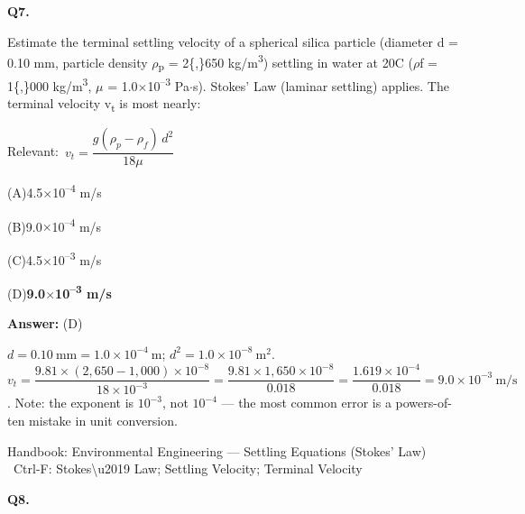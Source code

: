 \documentclass[11pt]{article}
\newcommand{\correct}[1]{\textbf{#1}\;{\color{accent}$\checkmark$}}
\newcommand{\optline}[2]{\par\noindent\hspace{1.2em}(#1)\hspace{0.6em}#2}
\begin{document}
\vspace{9pt}
\filbreak
\textbf{\color{accent}Q7.}\par\vspace{2pt}
Estimate the terminal settling velocity of a spherical silica particle (diameter d = 0.10 mm, particle density $\rho$\textsubscript{p} = 2\{,\}650 kg/m\textsuperscript{3}) settling in water at 20\textdegree{}C ($\rho$f = 1\{,\}000 kg/m\textsuperscript{3}, $\mu$ = 1.0$\times$10\textsuperscript{--}\textsuperscript{3} Pa$\cdot$s). Stokes' Law (laminar settling) applies. The terminal velocity v\textsubscript{t} is most nearly:\par\vspace{3pt}
{\small\color{soft}Relevant:}\ $v_t = \dfrac{g(\rho_p - \rho_f)\,d^{2}}{18\mu}$\par\vspace{3pt}
\optline{A}{4.5$\times$10\textsuperscript{--}\textsuperscript{4} m/s}
\optline{B}{9.0$\times$10\textsuperscript{--}\textsuperscript{4} m/s}
\optline{C}{4.5$\times$10\textsuperscript{--}\textsuperscript{3} m/s}
\optline{D}{\correct{9.0$\times$10\textsuperscript{--}\textsuperscript{3} m/s}}
\par\vspace{3pt}
\vspace{2pt}\par\noindent\colorbox{boxbg}{\parbox{\dimexpr\linewidth-2\fboxsep\relax}{%
\vspace{2pt}\textbf{Answer:} (D)\par\vspace{2pt}
{\small $d = 0.10\ \mathrm{mm} = 1.0\times10^{-4}\ \mathrm{m}$; $d^2 = 1.0\times10^{-8}\ \mathrm{m^2}$.  $v_t = \dfrac{9.81\times(2{,}650-1{,}000)\times 10^{-8}}{18\times10^{-3}} = \dfrac{9.81\times1{,}650\times10^{-8}}{0.018} = \dfrac{1.619\times10^{-4}}{0.018} = 9.0\times10^{-3}\ \mathrm{m/s}$. Note: the exponent is $10^{-3}$, not $10^{-4}$ --- the most common error is a powers-of-ten mistake in unit conversion.}\par\vspace{2pt}
{\footnotesize\color{soft}Handbook: Environmental Engineering --- Settling Equations (Stokes' Law) \textbullet\ Ctrl-F: Stokes\textbackslash{}u2019 Law; Settling Velocity; Terminal Velocity}\vspace{2pt}
}}
\vspace{9pt}
\filbreak
\textbf{\color{accent}Q8.}\par\vspace{2pt}
\end{document}
